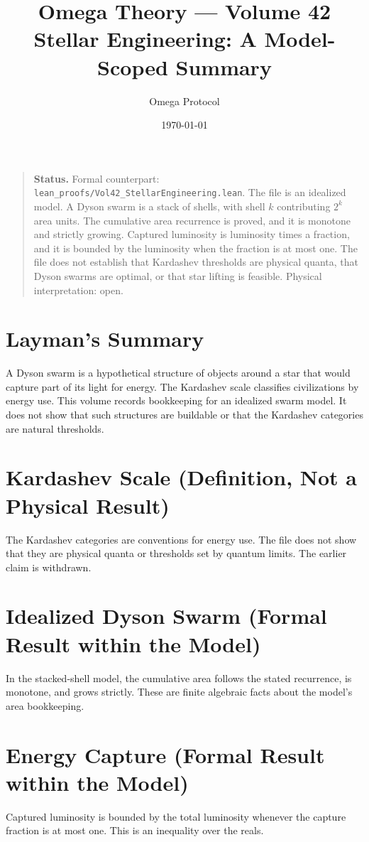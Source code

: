 \documentclass[11pt, a4paper]{article}
\title{Omega Theory --- Volume 42\\\Large Stellar Engineering: A Model-Scoped Summary}
\author{Omega Protocol}
\date{\today}
\begin{document}
\maketitle

\begin{quote}
\textbf{Status.} Formal counterpart: \texttt{lean\_proofs/Vol42\_StellarEngineering.lean}. The file is an idealized model. A Dyson swarm is a stack of shells, with shell $k$ contributing $2^k$ area units. The cumulative area recurrence is proved, and it is monotone and strictly growing. Captured luminosity is luminosity times a fraction, and it is bounded by the luminosity when the fraction is at most one. The file does not establish that Kardashev thresholds are physical quanta, that Dyson swarms are optimal, or that star lifting is feasible. Physical interpretation: open.
\end{quote}

\section*{Layman's Summary}
A Dyson swarm is a hypothetical structure of objects around a star that would capture part of its light for energy. The Kardashev scale classifies civilizations by energy use. This volume records bookkeeping for an idealized swarm model. It does not show that such structures are buildable or that the Kardashev categories are natural thresholds.

\section{Kardashev Scale (Definition, Not a Physical Result)}
The Kardashev categories are conventions for energy use. The file does not show that they are physical quanta or thresholds set by quantum limits. The earlier claim is withdrawn.

\section{Idealized Dyson Swarm (Formal Result within the Model)}
In the stacked-shell model, the cumulative area follows the stated recurrence, is monotone, and grows strictly. These are finite algebraic facts about the model's area bookkeeping.

\section{Energy Capture (Formal Result within the Model)}
Captured luminosity is bounded by the total luminosity whenever the capture fraction is at most one. This is an inequality over the reals.
\end{document}
